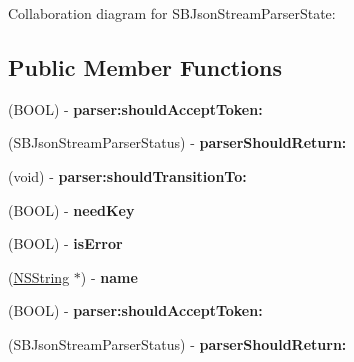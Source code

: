 \-Collaboration diagram for \-S\-B\-Json\-Stream\-Parser\-State\-:
\subsection*{\-Public \-Member \-Functions}
\begin{DoxyCompactItemize}
\item 
\hypertarget{interface_s_b_json_stream_parser_state_a4c82e9be435d6f393bf5a0467c1e83eb}{
(\-B\-O\-O\-L) -\/ {\bfseries parser\-:should\-Accept\-Token\-:}}
\label{interface_s_b_json_stream_parser_state_a4c82e9be435d6f393bf5a0467c1e83eb}

\item 
\hypertarget{interface_s_b_json_stream_parser_state_a7ba884f572ebae244fd252055aed25fc}{
(\-S\-B\-Json\-Stream\-Parser\-Status) -\/ {\bfseries parser\-Should\-Return\-:}}
\label{interface_s_b_json_stream_parser_state_a7ba884f572ebae244fd252055aed25fc}

\item 
\hypertarget{interface_s_b_json_stream_parser_state_a5ed454a903b6bd268f1c1b373e243013}{
(void) -\/ {\bfseries parser\-:should\-Transition\-To\-:}}
\label{interface_s_b_json_stream_parser_state_a5ed454a903b6bd268f1c1b373e243013}

\item 
\hypertarget{interface_s_b_json_stream_parser_state_aab97dd88c338d285cc9aca7f21875ae1}{
(\-B\-O\-O\-L) -\/ {\bfseries need\-Key}}
\label{interface_s_b_json_stream_parser_state_aab97dd88c338d285cc9aca7f21875ae1}

\item 
\hypertarget{interface_s_b_json_stream_parser_state_a8d04c21bcd093e5817bdbff30f39ba46}{
(\-B\-O\-O\-L) -\/ {\bfseries is\-Error}}
\label{interface_s_b_json_stream_parser_state_a8d04c21bcd093e5817bdbff30f39ba46}

\item 
\hypertarget{interface_s_b_json_stream_parser_state_ae150e3c382beb444010927434679cf77}{
(\hyperlink{class_n_s_string}{\-N\-S\-String} $\ast$) -\/ {\bfseries name}}
\label{interface_s_b_json_stream_parser_state_ae150e3c382beb444010927434679cf77}

\item 
\hypertarget{interface_s_b_json_stream_parser_state_a4c82e9be435d6f393bf5a0467c1e83eb}{
(\-B\-O\-O\-L) -\/ {\bfseries parser\-:should\-Accept\-Token\-:}}
\label{interface_s_b_json_stream_parser_state_a4c82e9be435d6f393bf5a0467c1e83eb}

\item 
\hypertarget{interface_s_b_json_stream_parser_state_a7ba884f572ebae244fd252055aed25fc}{
(\-S\-B\-Json\-Stream\-Parser\-Status) -\/ {\bfseries parser\-Should\-Return\-:}}
\label{interface_s_b_json_stream_parser_state_a7ba884f572ebae244fd252055aed25fc}


\end{DoxyCompactItemize}
